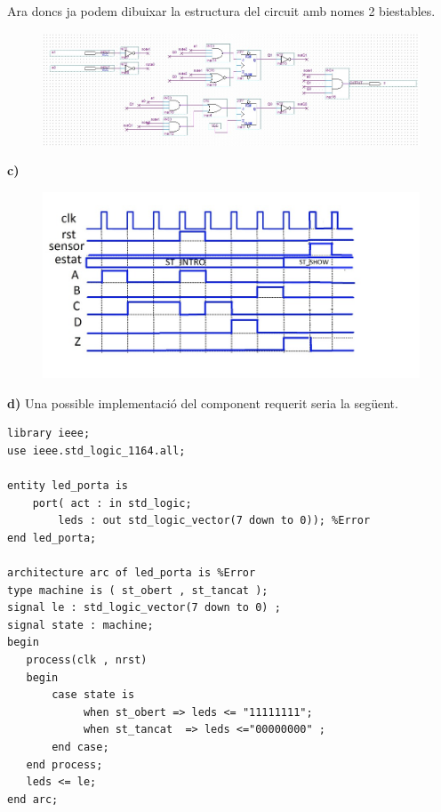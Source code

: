 \documentclass[12pt, a4papre]{article}
\begin{document}
	Ara doncs ja podem dibuixar la estructura del circuit amb nomes 2 biestables.
	
	\begin{figure}[H]
		\begin{center}
		\includegraphics[width=140mm]{DisenyB.jpeg}
		\end{center}
	\end{figure}
	
	\textbf{c)}
	
	\begin{figure}[H]
		\begin{center}
		\includegraphics[width=140mm]{cronogramaC.jpeg}
		\end{center}
	\end{figure}
	
	\textbf{d)} Una possible implementació del component requerit seria la següent.
	
	\begin{lstlisting}[style=vhdl, frame=single, basicstyle=\small]
library ieee;
use ieee.std_logic_1164.all;

entity led_porta is
    port( act : in std_logic;  
        leds : out std_logic_vector(7 down to 0)); %Error
end led_porta;

architecture arc of led_porta is %Error
type machine is ( st_obert , st_tancat );
signal le : std_logic_vector(7 down to 0) ;  
signal state : machine;
begin
   process(clk , nrst)
   begin
       case state is
            when st_obert => leds <= "11111111";
            when st_tancat  => leds <="00000000" ;
       end case;
   end process;
   leds <= le;
end arc;
	\end{lstlisting}
\end{document}
